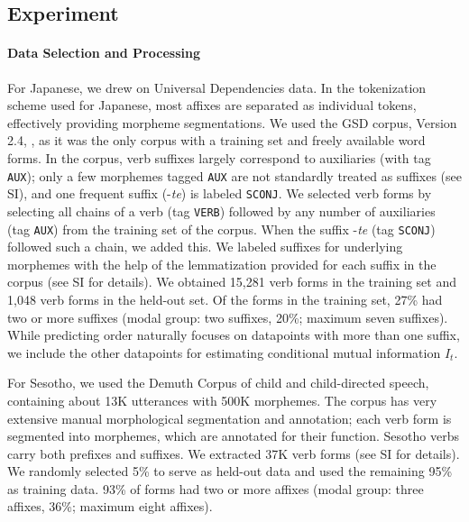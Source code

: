 

\subsection{Experiment}
\paragraph{Data Selection and Processing}
For Japanese, we drew on Universal Dependencies data.
In the tokenization scheme used for Japanese, most affixes are separated as individual tokens, effectively providing morpheme segmentations.
We used the GSD corpus, Version 2.4, \citep{tanaka2016universal, asahara2018universal}, as it was the only corpus with a training set and freely available word forms.
In the corpus, verb suffixes largely correspond to auxiliaries (with tag \texttt{AUX}); only a few morphemes tagged \texttt{AUX} are not standardly treated as suffixes (see SI), and one frequent suffix (-\textit{te}) is labeled \texttt{SCONJ}.
We selected verb forms by selecting all chains of a verb (tag \texttt{VERB}) followed by any number of auxiliaries (tag \texttt{AUX}) from the training set of the corpus. When the suffix -\textit{te} (tag \texttt{SCONJ}) followed such a chain, we added this.
We labeled suffixes for underlying morphemes with the help of the lemmatization provided for each suffix in the corpus (see SI for details).
We obtained 15,281 verb forms in the training set and 1,048 verb forms in the held-out set.
Of the forms in the training set, 27\% had two or more suffixes (modal group: two suffixes, 20\%; maximum seven suffixes).
While predicting order naturally focuses on datapoints with more than one suffix, we include the other datapoints for estimating conditional mutual information $I_t$.


For Sesotho, we used the Demuth Corpus \citep{demuth1992acquisition} of child and child-directed speech, containing about 13K utterances with 500K morphemes.
The corpus has very extensive manual morphological segmentation and annotation; each verb form is segmented into morphemes, which are annotated for their function.
Sesotho verbs carry both prefixes and suffixes.
We extracted 37K verb forms (see SI for details).
We randomly selected 5\% to serve as held-out data and used the remaining 95\% as training data.
93\% of forms had two or more affixes (modal group: three affixes, 36\%; maximum eight affixes).


